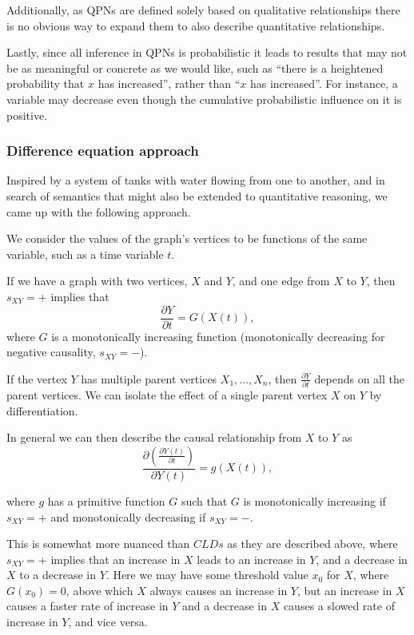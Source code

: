 Additionally, as QPNs are defined solely based on qualitative
relationships there is no obvious way to expand them to also describe
quantitative relationships.

Lastly, since all inference in QPNs is probabilistic it leads to
results that may not be as meaningful or concrete as we would like,
such as ``there is a heightened probability that $x$ has increased'',
rather than ``$x$ has increased''.
%
For instance, a variable may decrease even though the cumulative
probabilistic influence on it is positive.

\subsubsection{Difference equation approach}

Inspired by a system of tanks with water flowing from one to another,
and in search of semantics that might also be extended to quantitative
reasoning, we came up with the following approach.

We consider the values of the graph's vertices to be functions of the same
variable, such as a time variable $t$.

If we have a graph with two vertices, $X$ and $Y$, and one edge from $X$
to $Y$, then $s_{XY}=+$ implies that
\[\frac{\partial Y}{\partial t} = G(X(t)),\]
where $G$ is a monotonically increasing function (monotonically decreasing for negative
causality, $s_{XY}=-$).

If the vertex $Y$ has multiple parent vertices $X_1,\ldots,X_n$, then
$\frac{\partial Y}{\partial t}$ depends on all the parent vertices. We can
isolate the effect of a single parent vertex
 $X$ on $Y$ by differentiation.

In general we can then describe the causal relationship from $X$ to
$Y$ as
\[\frac{\partial\left( \frac{\partial Y(t)}{\partial t} \right)}{\partial Y(t)} =
  g(X(t)),\]

where $g$ has a primitive function $G$ such that $G$ is monotonically
increasing if $s_{XY}=+$ and monotonically decreasing if $s_{XY}= -$.

This is somewhat more nuanced than $CLDs$ as they are described above,
where $s_{XY}=+$ implies that an increase in $X$ leads to an increase
in $Y$, and a decrease in $X$ to a decrease in $Y$.
%
Here we may have some threshold value $x_0$ for $X$, where $G(x_0) = 0$,
above which $X$ always causes an increase in $Y$, but an increase in $X$
causes a faster rate of increase in $Y$ and a decrease in $X$ causes a
slowed rate of increase in $Y$, and vice versa.

